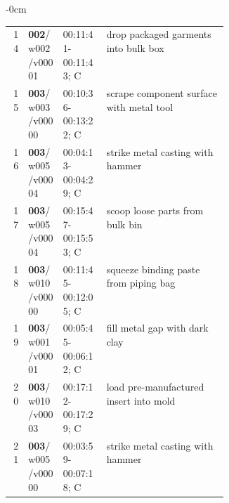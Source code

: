 \begin{table}[!t]
\begin{adjustwidth}{-\extralength}{0cm}
\begin{tabularx}{\linewidth}{@{}r p{0.16\linewidth} p{0.20\linewidth} L@{}}
14 & \textbf{002}/w002/v00001 & 00:11:41-00:11:43; C & drop packaged garments into bulk box \\
15 & \textbf{003}/w003/v00000 & 00:10:36-00:13:22; C & scrape component surface with metal tool \\
16 & \textbf{003}/w005/v00004 & 00:04:13-00:04:29; C & strike metal casting with hammer \\
17 & \textbf{003}/w005/v00004 & 00:15:47-00:15:53; C & scoop loose parts from bulk bin \\
18 & \textbf{003}/w010/v00000 & 00:11:45-00:12:05; C & squeeze binding paste from piping bag \\
19 & \textbf{003}/w001/v00001 & 00:05:45-00:06:12; C & fill metal gap with dark clay \\
20 & \textbf{003}/w010/v00003 & 00:17:12-00:17:29; C & load pre-manufactured insert into mold \\
21 & \textbf{003}/w005/v00000 & 00:03:59-00:07:18; C & strike metal casting with hammer \\
\bottomrule\end{tabularx}\end{adjustwidth}\end{table}
